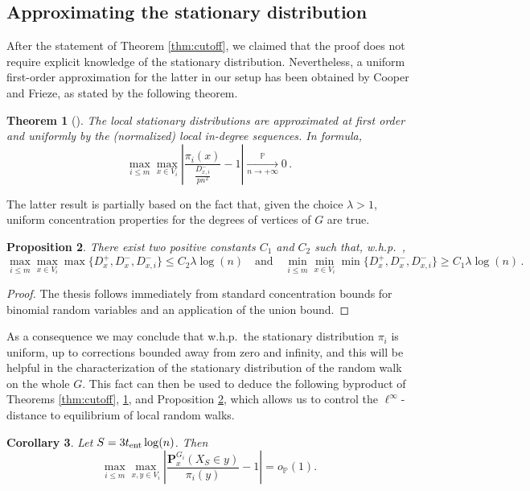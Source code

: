 \documentclass[11pt,oneside]{amsart}
\numberwithin{equation}{section}  %
\theoremstyle{plain}
\newtheorem{theorem}{Theorem}
\newtheorem{corollary}[theorem]{Corollary}
\newtheorem{proposition}[theorem]{Proposition}
\newcommand{\whp}{{w.h.p.~}}
\newcommand{\p}{\mathbb{P}}
\newcommand{\pconv}{\xrightarrow[n \to +\infty]{\quad \p \quad}}
\newcommand{\op}{o_{\p}}
\newcommand{\tent}{t_{\textup{ent}}}
\newcommand{\quench}{\mathbf{P}}
\begin{document}
\subsection{Approximating the stationary distribution}\label{suse:approx-pi}
After the statement of Theorem \ref{thm:cutoff}, we claimed that the proof does not require explicit knowledge of the stationary distribution. Nevertheless, a uniform first-order approximation for the latter in our setup has been obtained by Cooper and Frieze,
as stated by the following theorem.
\begin{theorem}[\cite{CF}] \label{thm:pi-char}
	The local stationary distributions are approximated at first order and uniformly by the (normalized) local in-degree sequences. In formula,
	\begin{equation}
		\max_{i \le m}\max_{x\in V_i}\left| \frac{\pi_i(x)}{\frac{D_{x,i}^-}{pn^2}}-1\right| \pconv 0\,.
	\end{equation}
\end{theorem}
The latter result is partially based on the fact that, given the choice $\lambda>1$, uniform concentration properties for the degrees of vertices of $G$ are true.
\begin{proposition}\label{prop:concentration-degrees}
	There exist two positive constants $C_1$ and $C_2$ such that, \whp,
	\begin{equation}\nonumber
		\max_{i \le m}\max_{x\in V_i}\max\{D_x^+,D_x^-,D_{x,i}^-\} \le C_2\lambda\log(n)\quad\text{and}\quad \min_{i \le m}\min_{x\in V_i}\min\{D_x^+,D_x^-,D_{x,i}^-\} \ge C_1\lambda\log(n)\,.
	\end{equation}
\end{proposition}
\begin{proof}
	The thesis follows immediately from standard concentration bounds for binomial random variables and an application of the union bound.
\end{proof}
As a consequence we may conclude that \whp the stationary distribution $\pi_i$ is uniform, up to corrections bounded away from zero and infinity, and this will be helpful in the characterization of the stationary distribution of the random walk on the whole $G$. 
This fact can then be used to deduce the following byproduct of Theorems \ref{thm:cutoff}, \ref{thm:pi-char}, and Proposition \ref{prop:concentration-degrees}, which allows us to control the $\ell^\infty$-distance to equilibrium of local random walks.
\begin{corollary}\label{coro:mixing}
	Let $S=3 \tent \log(n)$. Then 
	\begin{equation} \label{fast-mixing}
		\max_{i \le m}\max_{x,y\in V_i}
		\left|\frac{\quench^{G_i}_x(X_{S}\in y)}{\pi_i(y)}-1\right|=\op(1) .
	\end{equation}
\end{corollary}
\end{document}
